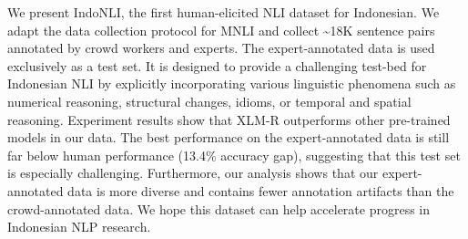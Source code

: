 We present IndoNLI, the first human-elicited NLI dataset for Indonesian. We adapt the data collection protocol for MNLI and collect {\textasciitilde}18K sentence pairs annotated by crowd workers and experts. The expert-annotated data is used exclusively as a test set. It is designed to provide a challenging test-bed for Indonesian NLI by explicitly incorporating various linguistic phenomena such as numerical reasoning, structural changes, idioms, or temporal and spatial reasoning. Experiment results show that XLM-R outperforms other pre-trained models in our data. The best performance on the expert-annotated data is still far below human performance (13.4\% accuracy gap), suggesting that this test set is especially challenging. Furthermore, our analysis shows that our expert-annotated data is more diverse and contains fewer annotation artifacts than the crowd-annotated data. We hope this dataset can help accelerate progress in Indonesian NLP research.
